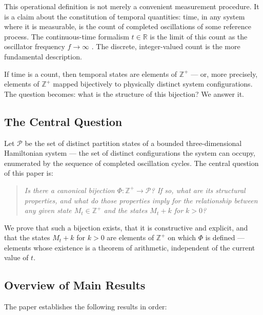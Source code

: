 \documentclass[twocolumn,10pt,a4paper]{article}
\theoremstyle{thmstyle}
\theoremstyle{definition}
\theoremstyle{remark}
\newcommand{\R}{\mathbb{R}}
\newcommand{\Zp}{\mathbb{Z}^{+}}
\newcommand{\Parts}{\mathcal{P}}
\newcommand{\PhiMap}{\varPhi}
\begin{document}
This operational definition is not merely a convenient measurement procedure. It is a claim about the constitution of temporal quantities: time, in any system where it is measurable, is the count of completed oscillations of some reference process. The continuous-time formalism $t \in \R$ is the limit of this count as the oscillator frequency $f \to \infty$ \citep{arnold1989}. The discrete, integer-valued count is the more fundamental description.

If time is a count, then temporal states are elements of $\Zp$ --- or, more precisely, elements of $\Zp$ mapped bijectively to physically distinct system configurations. The question becomes: what is the structure of this bijection? We answer it.

\subsection{The Central Question}

Let $\Parts$ be the set of distinct partition states of a bounded three-dimensional Hamiltonian system --- the set of distinct configurations the system can occupy, enumerated by the sequence of completed oscillation cycles. The central question of this paper is:

\begin{quote}
\emph{Is there a canonical bijection $\PhiMap : \Zp \to \Parts$? If so, what are its structural properties, and what do those properties imply for the relationship between any given state $M_t \in \Zp$ and the states $M_t + k$ for $k > 0$?}
\end{quote}

We prove that such a bijection exists, that it is constructive and explicit, and that the states $M_t + k$ for $k > 0$ are elements of $\Zp$ on which $\PhiMap$ is defined --- elements whose existence is a theorem of arithmetic, independent of the current value of $t$.

\subsection{Overview of Main Results}

The paper establishes the following results in order:
\end{document}
